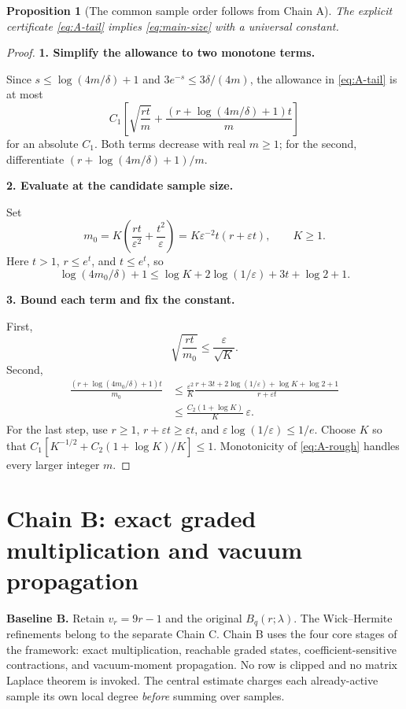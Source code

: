 \documentclass[11pt]{article}
\numberwithin{equation}{section}
\newtheorem{proposition}[theorem]{Proposition}
\theoremstyle{definition}\newtheorem{definition}[theorem]{Definition}
\theoremstyle{remark}\newtheorem{remark}[theorem]{Remark}
\newcommand{\step}[1]{\par\addvspace{.65\baselineskip}\Needspace{4\baselineskip}\noindent\textbf{#1}\par\nobreak\smallskip}
\begin{document}
\begin{proposition}[The common sample order follows from Chain A]\label{prop:A-size}
The explicit certificate \eqref{eq:A-tail} implies \eqref{eq:main-size} with a
universal constant.
\end{proposition}
\begin{proof}
\step{1. Simplify the allowance to two monotone terms.}
Since $s\le\log(4m/\delta)+1$ and $3e^{-s}\le3\delta/(4m)$, the allowance in
\eqref{eq:A-tail} is at most
\begin{equation}\label{eq:A-rough}
 C_1\left[\sqrt{\frac{rt}{m}}+
 \frac{(r+\log(4m/\delta)+1)t}{m}\right]
\end{equation}
for an absolute $C_1$. Both terms decrease with real $m\ge1$; for the second,
differentiate $(r+\log(4m/\delta)+1)/m$.

\step{2. Evaluate at the candidate sample size.}
Set
\[
 m_0=K\left(\frac{rt}{\varepsilon^2}+\frac{t^2}{\varepsilon}\right)
 =K\varepsilon^{-2}t(r+\varepsilon t),\qquad K\ge1.
\]
Here $t>1$, $r\le e^t$, and $t\le e^t$, so
\[
 \log(4m_0/\delta)+1
 \le\log K+2\log(1/\varepsilon)+3t+\log2+1.
\]

\step{3. Bound each term and fix the constant.}
First,
\[
 \sqrt{\frac{rt}{m_0}}\le\frac\varepsilon{\sqrt K}.
\]
Second,
\begin{align*}
 \frac{(r+\log(4m_0/\delta)+1)t}{m_0}
 &\le\frac{\varepsilon^2}{K}
 \frac{r+3t+2\log(1/\varepsilon)+\log K+\log2+1}{r+\varepsilon t}\\
 &\le\frac{C_2(1+\log K)}K\,\varepsilon.
\end{align*}
For the last step, use $r\ge1$, $r+\varepsilon t\ge\varepsilon t$, and
$\varepsilon\log(1/\varepsilon)\le1/e$.
Choose $K$ so that $C_1[K^{-1/2}+C_2(1+\log K)/K]\le1$.
Monotonicity of \eqref{eq:A-rough} handles every larger integer $m$.
\end{proof}

\clearpage
\section{Chain B: exact graded multiplication and vacuum propagation}\label{sec:B}
\begin{takeaway}
\textbf{Baseline B.} Retain $v_r=9r-1$ and the original $B_q(r;\lambda)$.
The Wick--Hermite refinements belong to the separate Chain C.
Chain B uses the four core stages of the framework: exact multiplication,
reachable graded states, coefficient-sensitive contractions, and vacuum-moment
propagation. No row is clipped and no matrix Laplace theorem is invoked.
The central estimate charges each already-active sample its own local degree
\emph{before} summing over samples.
\end{takeaway}
\end{document}
